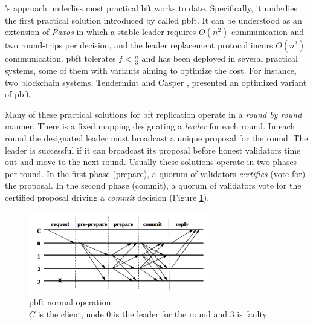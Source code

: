 \citeauthor{Dwork:1988:CPP:42282.42283}'s approach underlies most practical \gls{bft} works to date. Specifically, it underlies the first practical solution introduced by \cite{Castro:1999:PBF:296806.296824} called \gls{pbft}. It can be understood as an extension of \textit{Paxos} in which a stable leader requires $O(n^2)$ communication and two round-trips per decision, and the leader replacement protocol incurs $O(n^3)$ communication. \gls{pbft} tolerates $f < \displaystyle \frac{n}{3}$ and has been deployed in several practical systems, some of them with variants aiming to optimize the cost. For instance, two blockchain systems, Tendermint \citep{DBLP:journals/corr/abs-1807-04938} and Casper \citep{DBLP:journals/corr/abs-1710-09437}, presented an optimized variant of \gls{pbft}.

Many of these practical solutions for \gls{bft} replication operate in a \textit{round by round} manner. There is a fixed mapping designating a \textit{leader} for each round. In each round the designated leader must broadcast a unique proposal for the round. The leader is successful if it can broadcast its proposal before honest validators time out and move to the next round. Usually these solutions operate in two phases per round. In the first phase (prepare), a quorum of validators \textit{certifies} (vote for) the proposal. In the second phase (commit), a quorum of validators vote for the certified proposal driving a \textit{commit} decision (Figure \ref{fig:pbft}). 

\begin{figure}[h]
\centering
    \includegraphics[width=0.7\textwidth]{img/pbft.png}
    \caption{\gls{pbft} normal operation. \\ $C$ is the client, node $0$ is the leader for the round and $3$ is faulty \citep{Castro:1999:PBF:296806.296824}}
    \label{fig:pbft}
\end{figure}


